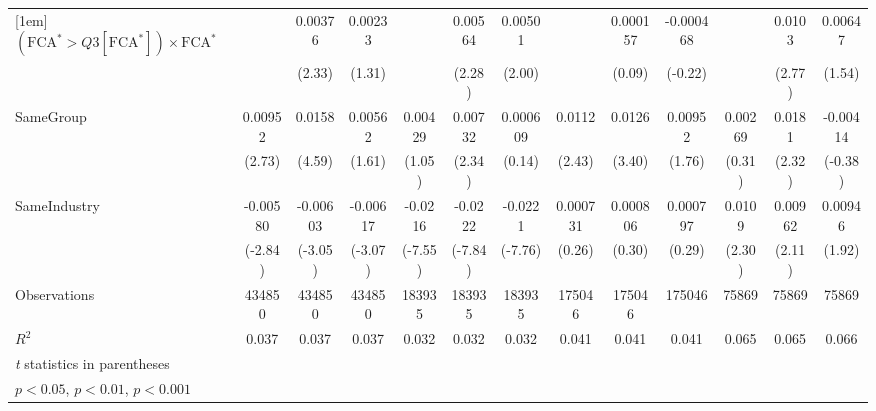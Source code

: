 {\begin{tabular}{l*{12}{c}}
[1em]
 $ (\text{FCA}^* > Q3[\text{FCA}^*]) \times {\text{FCA} ^*}  $ &                  &  0.00376\sym{*}  &  0.00233         &                  &  0.00564\sym{*}  &  0.00501         &                  & 0.000157         &-0.000468         &                  &   0.0103\sym{**} &  0.00647         \\
                &                  &   (2.33)         &   (1.31)         &                  &   (2.28)         &   (2.00)         &                  &   (0.09)         &  (-0.22)         &                  &   (2.77)         &   (1.54)         \\
[1em]
SameGroup       &  0.00952\sym{**} &   0.0158\sym{***}&  0.00562         &  0.00429         &  0.00732\sym{*}  & 0.000609         &   0.0112\sym{*}  &   0.0126\sym{**} &  0.00952         &  0.00269         &   0.0181\sym{*}  & -0.00414         \\
                &   (2.73)         &   (4.59)         &   (1.61)         &   (1.05)         &   (2.34)         &   (0.14)         &   (2.43)         &   (3.40)         &   (1.76)         &   (0.31)         &   (2.32)         &  (-0.38)         \\
[1em]
SameIndustry    & -0.00580\sym{**} & -0.00603\sym{**} & -0.00617\sym{**} &  -0.0216\sym{***}&  -0.0222\sym{***}&  -0.0221\sym{***}& 0.000731         & 0.000806         & 0.000797         &   0.0109\sym{*}  &  0.00962\sym{*}  &  0.00946         \\
                &  (-2.84)         &  (-3.05)         &  (-3.07)         &  (-7.55)         &  (-7.84)         &  (-7.76)         &   (0.26)         &   (0.30)         &   (0.29)         &   (2.30)         &   (2.11)         &   (1.92)         \\
\hline
Observations    &   434850         &   434850         &   434850         &   183935         &   183935         &   183935         &   175046         &   175046         &   175046         &    75869         &    75869         &    75869         \\
\(R^{2}\)       &    0.037         &    0.037         &    0.037         &    0.032         &    0.032         &    0.032         &    0.041         &    0.041         &    0.041         &    0.065         &    0.065         &    0.066         \\
\hline\hline
\multicolumn{13}{l}{\footnotesize \textit{t} statistics in parentheses}\\
\multicolumn{13}{l}{\footnotesize \sym{*} \(p<0.05\), \sym{**} \(p<0.01\), \sym{***} \(p<0.001\)}\\
\end{tabular}
}
